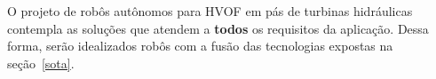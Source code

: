 O projeto de robôs autônomos para HVOF em pás de turbinas hidráulicas contempla
as soluções que atendem a \textbf{todos} os requisitos da aplicação. Dessa
forma, serão idealizados robôs com a fusão das tecnologias expostas na
seção~\ref{sota}.

